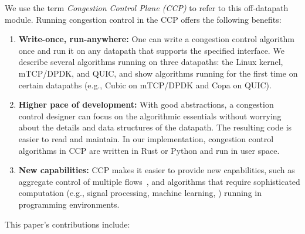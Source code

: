 We use the term {\em Congestion Control Plane (CCP)} to refer to this off-datapath module. Running congestion control in the CCP offers the following benefits:
\begin{enumerate}
    \item \textbf{Write-once, run-anywhere:} One can write a congestion control algorithm once and run it on any datapath that supports the specified interface. 
    We describe several algorithms running on three datapaths: the Linux kernel, mTCP/DPDK, and QUIC, and show algorithms running for the first time on certain datapaths (e.g., Cubic on mTCP/DPDK and Copa on QUIC).
    \item \textbf{Higher pace of development:} With good abstractions,
      a congestion control designer can focus on the algorithmic essentials
      without worrying about the details and data structures of the
      datapath. The resulting code is easier to read and maintain. In our implementation, congestion control algorithms in CCP are written in Rust or Python and run in user space. 
    \item \textbf{New capabilities:} CCP makes it easier to provide new
      capabilities, such as aggregate control of multiple flows~\cite{cm}, and algorithms that require sophisticated computation (e.g., signal processing, machine learning, \etc) running in \userspace programming environments. 
\end{enumerate}

\smallskip 
This paper's contributions include:

